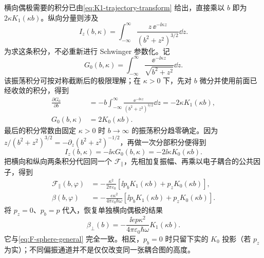 横向偶极需要的积分已由\cref{eq:K1-trajectory-transform} 给出，直接乘以 $b$ 即为 $2\kappa K_1(\kappa b)$。纵向分量则涉及
\begin{equation*}
I_z(b,\kappa)=\int_{-\infty}^{\infty}
\frac{z\,\ee^{-\ii\kappa z}}{(b^2+z^2)^{3/2}}\dd z.
\end{equation*}
为求这条积分，不必重新进行 Schwinger 参数化。记
\begin{equation*}
G_0(b,\kappa)=\int_{-\infty}^{\infty}
\frac{\ee^{-\ii\kappa z}}{\sqrt{b^2+z^2}}\dd z.
\end{equation*}
该振荡积分可按对称截断后的极限理解；在 $\kappa>0$ 下，先对 $b$ 微分并使用前面已经收敛的积分，得到
\begin{align*}
\frac{\partial G_0}{\partial b}
&=-b\int_{-\infty}^{\infty}
\frac{\ee^{-\ii\kappa z}}{(b^2+z^2)^{3/2}}\dd z
=-2\kappa K_1(\kappa b),\\
G_0(b,\kappa)&=2K_0(\kappa b).
\end{align*}
最后的积分常数由固定 $\kappa>0$ 时 $b\to\infty$ 的振荡积分趋零确定。因为
$z/(b^2+z^2)^{3/2}=-\partial_z(b^2+z^2)^{-1/2}$，再做一次分部积分便得到
\begin{equation}
I_z(b,\kappa)=-\ii\kappa G_0(b,\kappa)
=-2\ii\kappa K_0(\kappa b).
\label{eq:rayleigh-K0-longitudinal-transform}
\end{equation}
把横向和纵向两条积分代回同一个 $\mathcal F_\parallel$，先相加复振幅、再乘以电子耦合的公共因子，得到
\begin{equation}
\begin{aligned}
\mathcal F_\parallel(b,\varphi)
&=-\frac{\kappa^2}{2\pi\varepsilon_0}
\left[\ii p_bK_1(\kappa b)+p_zK_0(\kappa b)\right],\\
\beta(b,\varphi)
&=-\frac{e\kappa^2}{4\pi\varepsilon_0\hbar\omega}
\left[\ii p_bK_1(\kappa b)+p_zK_0(\kappa b)\right].
\end{aligned}
\label{eq:rayleigh-polarization-projection}
\end{equation}
将 $p_z=0$、$p_b=p$ 代入，恢复单独横向偶极的结果
\begin{equation}
\beta_\perp(b)=-\frac{\ii e p\kappa^2}{4\pi\varepsilon_0\hbar\omega}K_1(\kappa b).
\label{eq:dipole-to-beta-worked}
\end{equation}
它与\cref{eq:F-sphere-general} 完全一致。相反，$p_b=0$ 时只留下实的 $K_0$ 投影（若 $p_z$ 为实）；不同偏振通道并不是仅仅改变同一张耦合图的高度。

